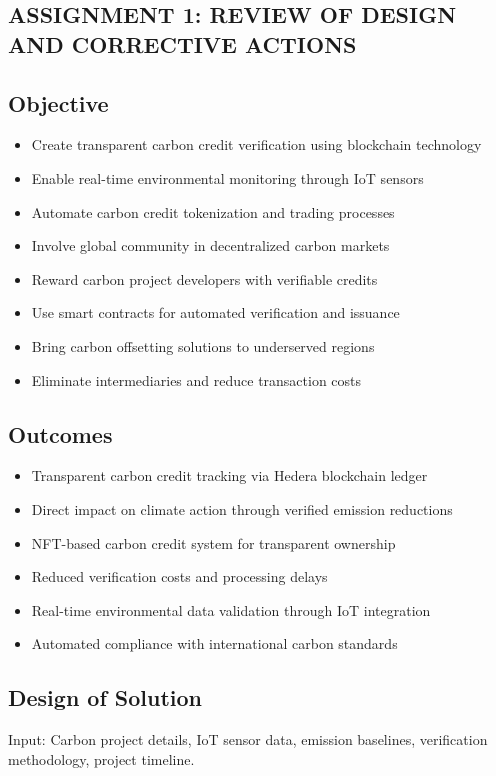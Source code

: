 \documentclass[oneside,a4paper,12pt]{book}
\begin{document}
\begin{appendices}
\section{ASSIGNMENT 1: REVIEW OF DESIGN AND CORRECTIVE ACTIONS}

\subsection{Objective}
\begin{itemize}
    \item Create transparent carbon credit verification using blockchain technology
    \item Enable real-time environmental monitoring through IoT sensors
    \item Automate carbon credit tokenization and trading processes
    \item Involve global community in decentralized carbon markets
    \item Reward carbon project developers with verifiable credits
    \item Use smart contracts for automated verification and issuance
    \item Bring carbon offsetting solutions to underserved regions
    \item Eliminate intermediaries and reduce transaction costs
\end{itemize}

\subsection{Outcomes}
\begin{itemize}
    \item Transparent carbon credit tracking via Hedera blockchain ledger
    \item Direct impact on climate action through verified emission reductions
    \item NFT-based carbon credit system for transparent ownership
    \item Reduced verification costs and processing delays
    \item Real-time environmental data validation through IoT integration
    \item Automated compliance with international carbon standards
\end{itemize}

\subsection{Design of Solution}
Input: Carbon project details, IoT sensor data, emission baselines, verification methodology, project timeline.


\end{appendices}
\end{document}
